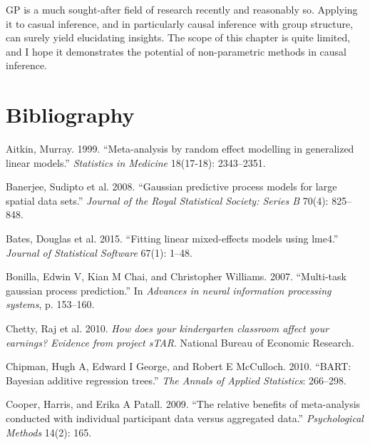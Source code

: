 GP is a much sought-after field of research recently and reasonably so.
Applying it to casual inference, and in particularly causal inference
with group structure, can surely yield elucidating insights. The scope
of this chapter is quite limited, and I hope it demonstrates the
potential of non-parametric methods in causal inference.

\newpage

\section*{Bibliography}\label{bibliography}

Aitkin, Murray. 1999. ``Meta-analysis by random effect modelling in
generalized linear models.'' \emph{Statistics in Medicine} 18(17-18):
2343--2351.

Banerjee, Sudipto et al. 2008. ``Gaussian predictive process models for
large spatial data sets.'' \emph{Journal of the Royal Statistical
Society: Series B} 70(4): 825--848.

Bates, Douglas et al. 2015. ``Fitting linear mixed-effects models using
lme4.'' \emph{Journal of Statistical Software} 67(1): 1--48.

Bonilla, Edwin V, Kian M Chai, and Christopher Williams. 2007.
``Multi-task gaussian process prediction.'' In \emph{Advances in neural
information processing systems}, p. 153--160.

Chetty, Raj et al. 2010. \emph{How does your kindergarten classroom
affect your earnings? Evidence from project sTAR}. National Bureau of
Economic Research.

Chipman, Hugh A, Edward I George, and Robert E McCulloch. 2010. ``BART:
Bayesian additive regression trees.'' \emph{The Annals of Applied
Statistics}: 266--298.

Cooper, Harris, and Erika A Patall. 2009. ``The relative benefits of
meta-analysis conducted with individual participant data versus
aggregated data.'' \emph{Psychological Methods} 14(2): 165.

